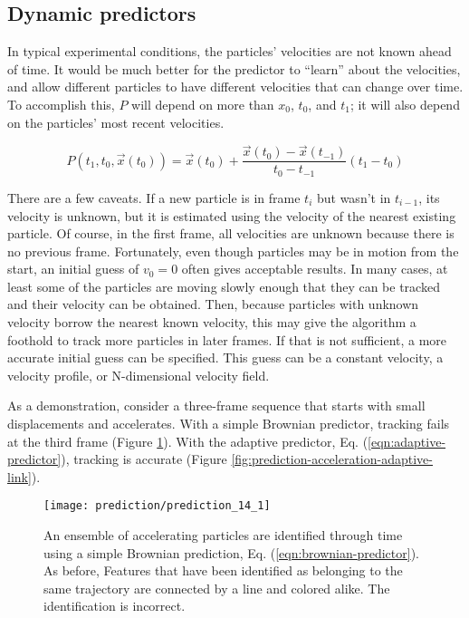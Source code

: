 \subsection{Dynamic predictors}\label{dynamic-predictors}

In typical experimental conditions, the particles' velocities are not known ahead of time. It would be much better for the predictor to ``learn'' about
the velocities, and allow different particles to have different
velocities that can change over time. To accomplish this, $P$ will depend on more than $x_0$, $t_0$, and $t_1$; it will also depend on the particles' most recent velocities.

\begin{equation}
\label{eqn:adaptive-predictor}
P(t_1, t_0, \vec x(t_0)) = \vec x(t_0) + \frac{\vec x(t_0) - \vec x(t_{-1})}{t_0 - t_{-1}} (t_1 - t_0)
\end{equation}

There are a few caveats.
  If a new particle is in frame $t_i$ but wasn't in $t_{i-1}$, its velocity is unknown, but it is estimated using the velocity of the nearest existing particle. Of course, in the first frame, all
  velocities are unknown because
  there is no previous frame. Fortunately, even though particles may be in motion from the start, an initial guess
  of $v_0 = 0$ often gives acceptable results. In many cases, at
  least some of the particles are moving slowly enough that they can be
  tracked and their velocity can be obtained. Then, because particles with
  unknown velocity borrow the nearest known velocity, this may give the algorithm a foothold to track more particles
  in later frames. If that is not sufficient, a more accurate initial guess can be specified. This guess can be a constant velocity, a velocity profile, or N-dimensional velocity field.

As a demonstration, consider a three-frame sequence that starts
with small displacements and accelerates. With a simple Brownian predictor, tracking fails at the third frame (Figure \ref{fig:prediction-acceleration-brownian-link}). With the adaptive predictor, Eq. (\ref{eqn:adaptive-predictor}), tracking is accurate (Figure \ref{fig:prediction-acceleration-adaptive-link}).


   \begin{figure}
    \centering
    \texttt{[image: prediction/prediction\_14\_1]}
    \caption{\label{fig:prediction-acceleration-brownian-link}An ensemble of accelerating particles are identified through time using a simple Brownian prediction, Eq. (\ref{eqn:brownian-predictor}). As before, Features that have been identified as belonging to the same trajectory are connected by a line and colored alike. The identification is incorrect.}
    \end{figure}
   


